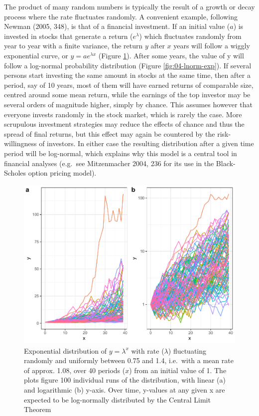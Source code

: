 \documentclass[
  12pt,
  a4paper, twoside]{book}
\begin{document}
The product of many random numbers is typically the result of a growth or decay process where the rate fluctuates randomly. A convenient example, following Newman (2005, 348), is that of a financial investment. If an initial value (\(a\)) is invested in stocks that generate a return (\(e^\lambda\)) which fluctuates randomly from year to year with a finite variance, the return \(y\) after \(x\) years will follow a wiggly exponential curve, or \(y = a e^{\lambda x}\) (Figure \ref{fig:04-multi-exp}). After some years, the value of y will follow a log-normal probability distribution (Figure \ref{fig:04-lnorm-exp}). If several persons start investing the same amount in stocks at the same time, then after a period, say of 10 years, most of them will have earned returns of comparable size, centred around some mean return, while the earnings of the top investor may be several orders of magnitude higher, simply by chance. This assumes however that everyone invests randomly in the stock market, which is rarely the case. More scrupulous investment strategies may reduce the effects of chance and thus the spread of final returns, but this effect may again be countered by the risk-willingness of investors. In either case the resulting distribution after a given time period will be log-normal, which explains why this model is a central tool in financial analyses (e.g.~see Mitzenmacher 2004, 236 for its use in the Black-Scholes option pricing model).



\begin{figure}

{\centering \includegraphics[width=0.9\linewidth]{bookdown-demo_files/figure-latex/04-multi-exp-1} 

}

\caption[Exponential distributions with randomly fluctuating rate]{Exponential distribution of \(y = \lambda ^x\) with rate (\(\lambda\)) fluctuating randomly and uniformly between 0.75 and 1.4, i.e.~with a mean rate of approx. 1.08, over 40 periods (\(x\)) from an initial value of 1. The plots figure 100 individual runs of the distribution, with linear (a) and logarithmic (b) y-axis. Over time, y-values at any given x are expected to be log-normally distributed by the Central Limit Theorem}\label{fig:04-multi-exp}
\end{figure}
\end{document}
